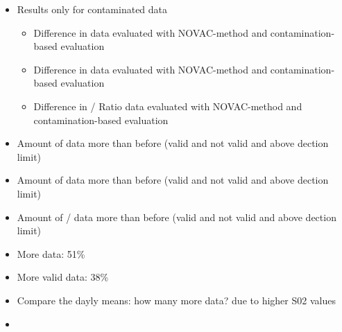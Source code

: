 \documentclass  [
  paper    = a4,
  BCOR     = 10mm,
  twoside,
  fontsize = 12pt,
  fleqn,
  toc      = bibnumbered,
  toc      = listofnumbered,
  numbers  = noendperiod,
  headings = normal,
  listof   = leveldown,
  version  = 3.03
]                                       {scrreprt}
\begin{document}
	\begin{itemize}
		\item Results only for contaminated data
		\begin{itemize}
			\item Difference in  data evaluated with NOVAC-method and contamination-based evaluation
			\item Difference in  data evaluated with NOVAC-method and contamination-based evaluation
			\item Difference in / Ratio data evaluated with NOVAC-method and contamination-based evaluation
		\end{itemize}
		\item Amount of  data more than before (valid and not valid and above dection limit)
		\item Amount of  data more than before (valid and not valid and above dection limit)
		\item Amount of / data more than before (valid and not valid and above dection limit)
		\item More  data: 51\%
		\item  More valid  data: 38\%
		\item Compare the dayly means: how many more data? due to higher S02 values
		\item 
	\end{itemize}
	
\end{document}
